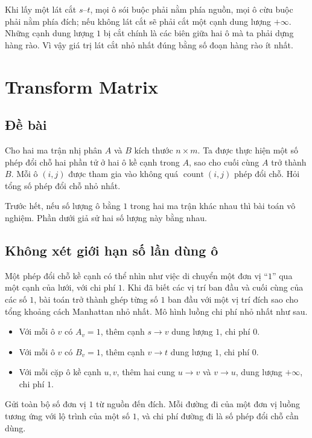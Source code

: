 \documentclass[11pt]{article}
\begin{document}
Khi lấy một lát cắt $s$--$t$, mọi ô sói buộc phải nằm phía nguồn, mọi ô cừu
buộc phải nằm phía đích; nếu không lát cắt sẽ phải cắt một cạnh dung lượng
$+\infty$. Những cạnh dung lượng $1$ bị cắt chính là các biên giữa hai ô mà ta
phải dựng hàng rào. Vì vậy giá trị lát cắt nhỏ nhất đúng bằng số đoạn hàng rào
ít nhất.

\section{Transform Matrix}

\subsection*{Đề bài}

Cho hai ma trận nhị phân $A$ và $B$ kích thước $n\times m$. Ta được thực hiện
một số phép đổi chỗ hai phần tử ở hai ô kề cạnh trong $A$, sao cho cuối cùng
$A$ trở thành $B$. Mỗi ô $(i,j)$ được tham gia vào không quá
$\operatorname{count}(i,j)$ phép đổi chỗ. Hỏi tổng số phép đổi chỗ nhỏ nhất.

Trước hết, nếu số lượng ô bằng $1$ trong hai ma trận khác nhau thì bài toán vô
nghiệm. Phần dưới giả sử hai số lượng này bằng nhau.

\subsection*{Không xét giới hạn số lần dùng ô}

Một phép đổi chỗ kề cạnh có thể nhìn như việc di chuyển một đơn vị ``$1$'' qua
một cạnh của lưới, với chi phí $1$. Khi đã biết các vị trí ban đầu và cuối
cùng của các số $1$, bài toán trở thành ghép từng số $1$ ban đầu với một vị
trí đích sao cho tổng khoảng cách Manhattan nhỏ nhất. Mô hình luồng chi phí
nhỏ nhất như sau.

\begin{itemize}
  \item Với mỗi ô $v$ có $A_v=1$, thêm cạnh $s\to v$ dung lượng $1$, chi phí
  $0$.
  \item Với mỗi ô $v$ có $B_v=1$, thêm cạnh $v\to t$ dung lượng $1$, chi phí
  $0$.
  \item Với mỗi cặp ô kề cạnh $u,v$, thêm hai cung $u\to v$ và $v\to u$, dung
  lượng $+\infty$, chi phí $1$.
\end{itemize}

Gửi toàn bộ số đơn vị $1$ từ nguồn đến đích. Mỗi đường đi của một đơn vị luồng
tương ứng với lộ trình của một số $1$, và chi phí đường đi là số phép đổi chỗ
cần dùng.
\end{document}
